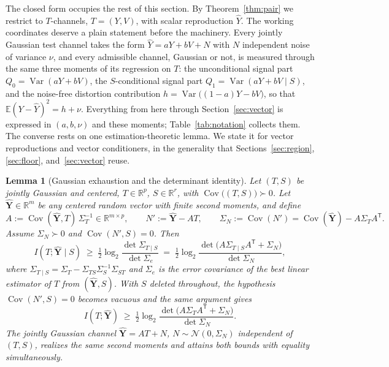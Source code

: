 ﻿\documentclass[11pt,onecolumn]{IEEEtran}
\newtheorem{lemma}[theorem]{Lemma}
\newcommand{\E}{\mathbb{E}}
\newcommand{\R}{\mathbb{R}}
\newcommand{\Cov}{\operatorname{Cov}}
\newcommand{\hY}{\widehat{Y}}
\begin{document}
The closed form occupies the rest of this section. By
Theorem~\ref{thm:pair} we restrict to $T$-channels, $T=(Y,V)$, with
scalar reproduction $\hY$. The working coordinates deserve a plain
statement before the machinery. Every jointly Gaussian test channel
takes the form $\hY=aY+bV+N$ with $N$ independent noise of variance
$\nu$, and every admissible channel, Gaussian or not, is measured through
the same three moments of its regression on $T$: the unconditional
signal part $Q_0=\operatorname{Var}(aY+bV)$, the $S$-conditional signal
part $Q_1=\operatorname{Var}(aY+bV\mid S)$, and the noise-free
distortion contribution $h=\operatorname{Var}\bigl((1-a)Y-bV\bigr)$, so
that $\E(Y-\hY)^2=h+\nu$. Everything from here through
Section~\ref{sec:vector} is expressed in $(a,b,\nu)$ and these moments;
Table~\ref{tab:notation} collects them. The converse rests on one
estimation-theoretic lemma. We state it for vector reproductions and
vector conditioners, in the generality that
Sections~\ref{sec:region}, \ref{sec:floor}, and~\ref{sec:vector} reuse.

\begin{lemma}[Gaussian exhaustion and the determinant identity]
\label{lem:gauss}
Let $(T,S)$ be jointly Gaussian and centered, $T\in\R^p$, $S\in\R^r$,
with $\Cov\bigl((T,S)\bigr)\succ0$. Let $\hat{\mathbf Y}\in\R^m$ be any
centered random vector with finite second moments, and define
\[
A:=\Cov(\hat{\mathbf Y},T)\,\Sigma_T^{-1}\in\R^{m\times p},\qquad
N':=\hat{\mathbf Y}-AT,\qquad
\Sigma_N:=\Cov(N')=\Cov(\hat{\mathbf Y})-A\Sigma_TA^{\mathsf T}.
\]
Assume $\Sigma_N\succ0$ and $\Cov(N',S)=0$. Then
\begin{equation}
I(T;\hat{\mathbf Y}\mid S)\;\ge\;\tfrac12\log_2
\frac{\det\Sigma_{T\mid S}}{\det\Sigma_e}
\;=\;\tfrac12\log_2
\frac{\det\bigl(A\Sigma_{T\mid S}A^{\mathsf T}+\Sigma_N\bigr)}
{\det\Sigma_N},
\label{eq:lem-cond}
\end{equation}
where $\Sigma_{T\mid S}=\Sigma_T-\Sigma_{TS}\Sigma_S^{-1}\Sigma_{ST}$
and $\Sigma_e$ is the error covariance of the best linear estimator of
$T$ from $(\hat{\mathbf Y},S)$. With $S$ deleted throughout, the
hypothesis $\Cov(N',S)=0$ becomes vacuous and the same argument gives
\begin{equation}
I(T;\hat{\mathbf Y})\;\ge\;\tfrac12\log_2
\frac{\det\bigl(A\Sigma_TA^{\mathsf T}+\Sigma_N\bigr)}{\det\Sigma_N}.
\label{eq:lem-rate}
\end{equation}
The jointly Gaussian channel $\hat{\mathbf Y}=AT+N$,
$N\sim\mathcal N(0,\Sigma_N)$ independent of $(T,S)$, realizes the same
second moments and attains both bounds with equality simultaneously.
\end{lemma}
\end{document}
